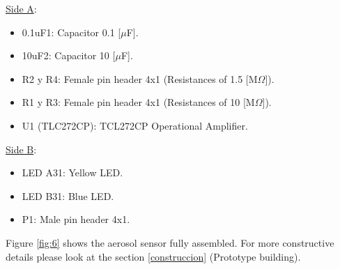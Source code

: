 \documentclass[12pt,letterpaper]{article}
\numberwithin{figure}{section}
\numberwithin{equation}{section}
\numberwithin{table}{section}
\begin{document}
\underline{Side A}:

\begin{itemize}
    \item 0.1uF1: Capacitor 0.1 [$\mu$F].
    \item 10uF2: Capacitor 10 [$\mu$F].
    \item R2 y R4: Female pin header 4x1 (Resistances of 1.5 [M$\Omega$]).
    \item R1 y R3: Female pin header 4x1 (Resistances of 10 [M$\Omega$]).
    \item U1 (TLC272CP): TCL272CP Operational Amplifier.
\end{itemize}

\underline{Side B}:

\begin{itemize}
    \item LED A31: Yellow LED.
    \item LED B31: Blue LED.
    \item P1: Male pin header 4x1.
\end{itemize}

Figure \ref{fig:6} shows the aerosol sensor fully assembled. For more constructive details please look at the section \ref{construccion} (Prototype building).
\end{document}
